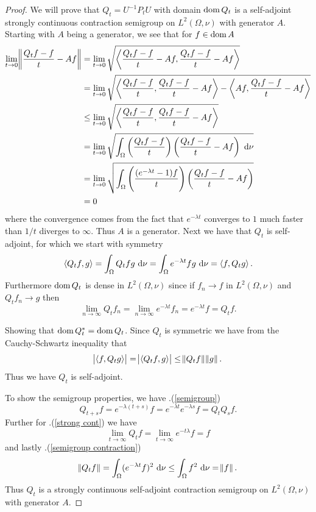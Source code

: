 \begin{proof}
	We will prove that $Q_t = U^{-1}P_tU$ with domain $\operatorname{dom} Q_t$ is a self-adjoint strongly continuous contraction semigroup on $L^2(\Omega, \nu)$ with generator $A$. Starting with $A$ being a generator, we see that for $f \in \operatorname{dom} A$
	\begin{align}
		\lim_{t \to 0} \norm{\frac{Q_tf-f}{t} - Af} &= \lim_{t \to 0}\sqrt{\left\langle \frac{Q_tf-f}{t} - Af, \frac{Q_tf-f}{t} - Af \right\rangle} \\
		&= \lim_{t \to 0}\sqrt{\left\langle \frac{Q_tf-f}{t}, \frac{Q_tf-f}{t} - Af \right\rangle - \left\langle Af, \frac{Q_tf-f}{t} - Af \right\rangle} \\
		&\leq \lim_{t \to 0}\sqrt{\left\langle \frac{Q_tf-f}{t}, \frac{Q_tf-f}{t} - Af \right\rangle} \\
		&= \lim_{t \to 0}\sqrt{\int_{\Omega}\left(\frac{Q_tf-f}{t}\right)\left(\frac{Q_tf-f}{t} - Af\right)  \ \text{d} \nu} \\
		&= \lim_{t \to 0}\sqrt{\int_{\Omega}\left(\frac{(e^{-\lambda t}-1)f}{t}\right)\left(\frac{Q_tf-f}{t} - Af\right)} \\
			&= 0
	\end{align}
	where the convergence comes from the fact that $e^{-\lambda t}$ converges to $1$ much faster than $1/t$ diverges to $\infty$.  Thus $A$ is a generator.
	Next we have that $Q_t$ is self-adjoint, for which we start with symmetry
	\begin{equation}
		\left\langle Q_t f, g \right\rangle = \int_{\Omega} Q_t f g \ \text{d} \nu = \int_{\Omega} e^{-\lambda t} f g \ \text{d} \nu = \left\langle f, Q_t g \right\rangle.
	\end{equation}
	Furthermore $\operatorname{dom} Q_t$ is dense in $L^2(\Omega, \nu)$ since if $f_n \to f$ in $L^2(\Omega, \nu)$ and $Q_t f_n \to g$ then
	\begin{equation}
		\lim_{n \to \infty} Q_t f_n = \lim_{n \to \infty} e^{-\lambda t}f_n = e^{-\lambda t}f = Q_t f.
	\end{equation} 
	
	Showing that $\operatorname{dom} Q_{t}^{*} = \operatorname{dom} Q_t$. Since $Q_t$ is symmetric we have from the Cauchy-Schwartz inequality that
	\begin{equation}\label{operatorAndAdjointHaveSameDom}
		\abs{\left\langle f, Q_tg \right\rangle} = \abs{\left\langle Q_t f, g \right\rangle} \leq \norm{Q_t f} \norm{g}.
	\end{equation}
	Thus we have $Q_t$ is self-adjoint. 
	
	To show the semigroup properties, we have .(\ref{semigroup})
	\begin{equation}
		Q_{t+s}f = e^{-\lambda (t +s )}f = e^{-\lambda t}e^{-\lambda s}f = Q_t Q_s f.
	\end{equation}
	Further for .(\ref{strong cont}) we have
	\begin{equation}
		\lim_{t \to \infty} Q_t f = \lim_{t \to \infty} e^{-t\lambda} f = f
	\end{equation}
	and lastly .(\ref{semigroup contraction})
	\begin{equation}
		\norm{Q_t f} = \int_{\Omega} (e^{-\lambda t}f)^2 \ \text{d} \nu\leq \int_{\Omega} f^2 \ \text{d} \nu = \norm{f} .
	\end{equation}
	Thus $Q_t$ is a strongly continuous self-adjoint contraction semigroup on $L^2(\Omega, \nu)$ with generator $A$.
\end{proof}

